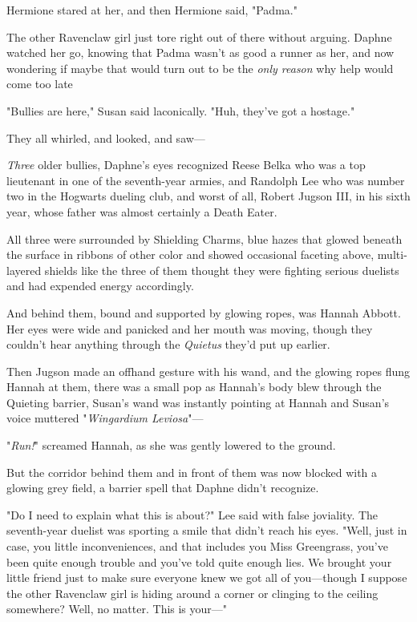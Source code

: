 Hermione stared at her, and then Hermione said, "Padma."

The other Ravenclaw girl just tore right out of there without arguing. Daphne
watched her go, knowing that Padma wasn't as good a runner as her, and now
wondering if maybe that would turn out to be the \emph{only reason} why help
would come too late{\el}

"Bullies are here," Susan said laconically. "Huh, they've got a hostage."

They all whirled, and looked, and saw—

\emph{Three} older bullies, Daphne's eyes recognized Reese Belka who was a top
lieutenant in one of the seventh-year armies, and Randolph Lee who was number
two in the Hogwarts dueling club, and worst of all, Robert Jugson III, in his
sixth year, whose father was almost certainly a Death Eater.

All three were surrounded by Shielding Charms, blue hazes that glowed beneath
the surface in ribbons of other color and showed occasional faceting above,
multi-layered shields like the three of them thought they were fighting serious
duelists and had expended energy accordingly.

And behind them, bound and supported by glowing ropes, was Hannah Abbott. Her
eyes were wide and panicked and her mouth was moving, though they couldn't hear
anything through the \emph{Quietus} they'd put up earlier.

Then Jugson made an offhand gesture with his wand, and the glowing ropes flung
Hannah at them, there was a small pop as Hannah's body blew through the
Quieting barrier, Susan's wand was instantly pointing at Hannah and Susan's
voice muttered "\emph{Wingardium Leviosa}"—

"\emph{Run!}" screamed Hannah, as she was gently lowered to the ground.

But the corridor behind them and in front of them was now blocked with a
glowing grey field, a barrier spell that Daphne didn't recognize.

"Do I need to explain what this is about?" Lee said with false joviality. The
seventh-year duelist was sporting a smile that didn't reach his eyes. "Well,
just in case, you little inconveniences, and that includes you Miss Greengrass,
you've been quite enough trouble and you've told quite enough lies. We brought
your little friend just to make sure everyone knew we got all of you—though I
suppose the other Ravenclaw girl is hiding around a corner or clinging to the
ceiling somewhere? Well, no matter. This is your—"

